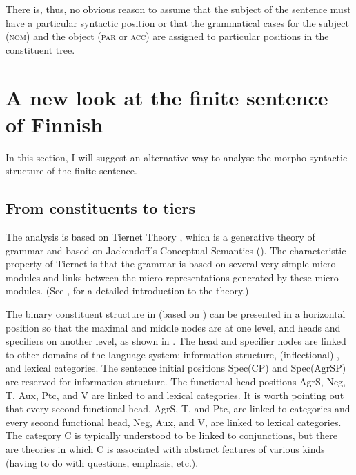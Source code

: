 \documentclass[output=paper]{langsci/langscibook}
\begin{document}
There is, thus, no obvious reason to assume that the subject of the sentence must have a particular syntactic position or that the grammatical cases for the subject (\textsc{nom}) and the object (\textsc{par} or \textsc{acc}) are assigned to particular positions in the constituent tree.

\section{A new look at the finite sentence of Finnish}%
In this section, I will suggest an alternative way to analyse the morpho-syntactic structure of the  finite sentence. 
\subsection{From constituents to tiers}

The analysis is based on Tiernet Theory \citep{Nikanne1990,Nikanne2002,Nikanne2008,Nikannefc,Pörn2004,Paulsen2011,Petrova2011}, which is a generative theory of grammar and based on Jackendoff’s Conceptual Semantics (\citeyear{Jackendoff1972,Jackendoff1983,Jackendoff1987,Jackendoff2002}). The characteristic property of Tiernet is that the grammar is based on several very simple micro-modules and links between the micro-representations generated by these micro-modules. (See \citealt{Nikannefc}, for a detailed introduction to the theory.)

The binary constituent structure in  (based on \citealt{HolmbergEtAl1993}) can be presented in a horizontal position so that the maximal and middle nodes are at one level, and heads and specifiers on another level, as shown in . The head and specifier nodes are linked to other domains of the language system: information structure, (inflectional) , and lexical categories. The sentence initial positions Spec(CP) and Spec(AgrSP) are reserved for information structure.  The functional head positions AgrS, Neg, T, Aux, Ptc, and V are linked to  and lexical categories. It is worth pointing out that every second functional head, AgrS, T, and Ptc, are linked to  categories and every second functional head, Neg, Aux, and V, are linked to lexical categories. The category C is typically understood to be linked to conjunctions, but there are theories in which C is associated with abstract features of various kinds (having to do with questions, emphasis, etc.).
\end{document}
